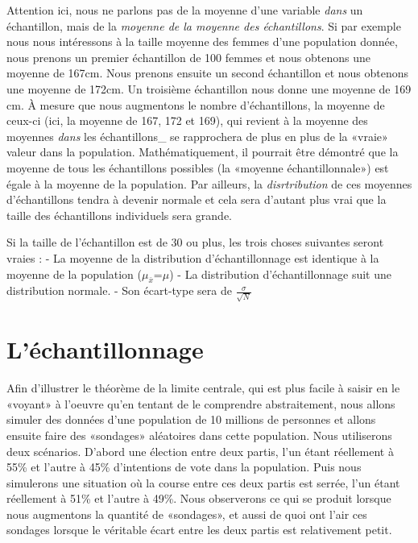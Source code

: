\documentclass[
]{book}
\begin{document}
Attention ici, nous ne parlons pas de la moyenne d'une variable \emph{dans} un échantillon, mais de la \emph{moyenne de la moyenne des échantillons}. Si par exemple nous nous intéressons à la taille moyenne des femmes d'une population donnée, nous prenons un premier échantillon de 100 femmes et nous obtenons une moyenne de 167cm. Nous prenons ensuite un second échantillon et nous obtenons une moyenne de 172cm. Un troisième échantillon nous donne une moyenne de 169 cm. À mesure que nous augmentons le nombre d'échantillons, la moyenne de ceux-ci (ici, la moyenne de 167, 172 et 169), qui revient à la moyenne des moyennes \emph{dans} les échantillons\_ se rapprochera de plus en plus de la «vraie» valeur dans la population. Mathématiquement, il pourrait être démontré que la moyenne de tous les échantillons possibles (la «moyenne échantillonnale») est égale à la moyenne de la population. Par ailleurs, la \emph{disrtribution} de ces moyennes d'échantillons tendra à devenir normale et cela sera d'autant plus vrai que la taille des échantillons individuels sera grande.

Si la taille de l'échantillon est de 30 ou plus, les trois choses suivantes seront vraies :
- La moyenne de la distribution d'échantillonnage est identique à la moyenne de la population (\({ \mu }_{ \bar{x} }\)=\(\mu\))
- La distribution d'échantillonnage suit une distribution normale.
- Son écart-type sera de \(\frac { \sigma }{ \sqrt { N } }\)

\hypertarget{luxe9chantillonnage}{%
\section{L'échantillonnage}\label{luxe9chantillonnage}}

Afin d'illustrer le théorème de la limite centrale, qui est plus facile à saisir en le «voyant» à l'oeuvre qu'en tentant de le comprendre abstraitement, nous allons simuler des données d'une population de 10 millions de personnes et allons ensuite faire des «sondages» aléatoires dans cette population. Nous utiliserons deux scénarios. D'abord une élection entre deux partis, l'un étant réellement à 55\% et l'autre à 45\% d'intentions de vote dans la population. Puis nous simulerons une situation où la course entre ces deux partis est serrée, l'un étant réellement à 51\% et l'autre à 49\%. Nous observerons ce qui se produit lorsque nous augmentons la quantité de «sondages», et aussi de quoi ont l'air ces sondages lorsque le véritable écart entre les deux partis est relativement petit.
\end{document}

